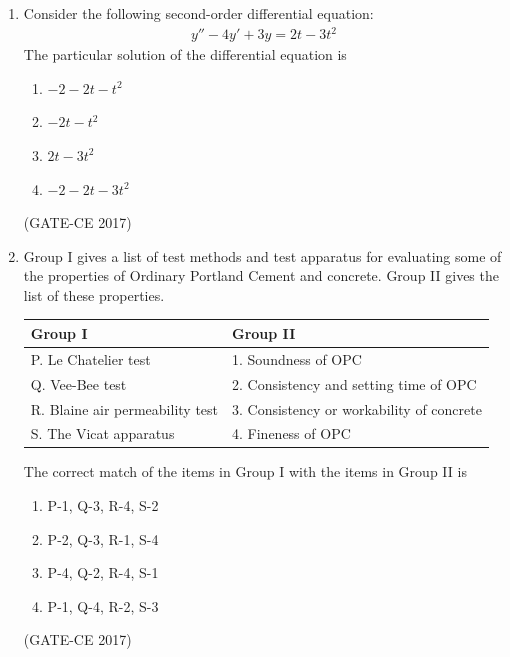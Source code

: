 \documentclass[journal,12pt,onecolumn]{article}
\theoremstyle{remark}
\begin{document}
\begin{enumerate}
    \item Consider the following second-order differential equation:
    \begin{align}
    y'' - 4y' + 3y = 2t - 3t^2
    \end{align}
    The particular solution of the differential equation is
    \begin{multicols}{4}
    \begin{enumerate}
        \item $-2 - 2t - t^2$  
        \item $-2t - t^2$  
        \item $2t - 3t^2$  
        \item $-2 - 2t - 3t^2$  
    \end{enumerate}
    \end{multicols}
   \hfill (GATE-CE 2017)

    \item Group I gives a list of test methods and test apparatus for evaluating some of the properties of Ordinary Portland Cement  and concrete. Group II gives the list of these properties.
    \begin{table}[H]
    \centering
    \begin{tabular}{|l|l|}
    \hline
    \textbf{Group I} & \textbf{Group II} \\
    \hline
    P. Le Chatelier test & 1. Soundness of OPC \\
    Q. Vee-Bee test & 2. Consistency and setting time of OPC \\
    R. Blaine air permeability test & 3. Consistency or workability of concrete \\
    S. The Vicat apparatus & 4. Fineness of OPC \\
    \hline
    \end{tabular}
    \end{table}
    The correct match of the items in Group I with the items in Group II is
    \begin{enumerate}
        \item P-1, Q-3, R-4, S-2  
        \item P-2, Q-3, R-1, S-4  
        \item P-4, Q-2, R-4, S-1  
        \item P-1, Q-4, R-2, S-3  
    \end{enumerate}
    \hfill (GATE-CE 2017)


\end{enumerate}
\end{document}
